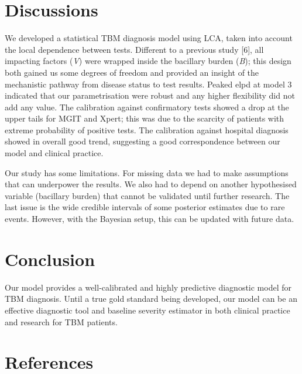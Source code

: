 \documentclass[
]{article}
\begin{document}
\hypertarget{discussions}{%
\section{Discussions}\label{discussions}}

We developed a statistical TBM diagnosis model using LCA, taken into account the local dependence between tests. Different to a previous study {[}6{]}, all impacting factors (\emph{V}) were wrapped inside the bacillary burden (\emph{B}); this design both gained us some degrees of freedom and provided an insight of the mechanistic pathway from disease status to test results. Peaked elpd at model 3 indicated that our parametrisation were robust and any higher flexibility did not add any value. The calibration against confirmatory tests showed a drop at the upper tails for MGIT and Xpert; this was due to the scarcity of patients with extreme probability of positive tests. The calibration against hospital diagnosis showed in overall good trend, suggesting a good correspondence between our model and clinical practice.

Our study has some limitations. For missing data we had to make assumptions that can underpower the results. We also had to depend on another hypothesised variable (bacillary burden) that cannot be validated until further research. The last issue is the wide credible intervals of some posterior estimates due to rare events. However, with the Bayesian setup, this can be updated with future data.

\hypertarget{conclusion}{%
\section{Conclusion}\label{conclusion}}

Our model provides a well-calibrated and highly predictive diagnostic model for TBM diagnosis. Until a true gold standard being developed, our model can be an effective diagnostic tool and baseline severity estimator in both clinical practice and research for TBM patients.

\hypertarget{references}{%
\section{References}\label{references}}
\end{document}
